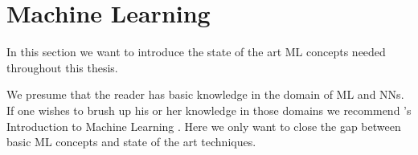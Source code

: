 \section{Machine Learning}
\label{chp:fundamentals:sec:machine_learning}
In this section we want to introduce the state of the art \ac{ML} concepts needed throughout this thesis.

We presume that the reader has basic knowledge in the domain of \ac{ML} and \acp{NN}.
If one wishes to brush up his or her knowledge in those domains we recommend \citeauthor{Alpaydin:2020}'s Introduction to Machine Learning \parencite{Alpaydin:2020}.
Here we only want to close the gap between basic \ac{ML} concepts and state of the art techniques.




